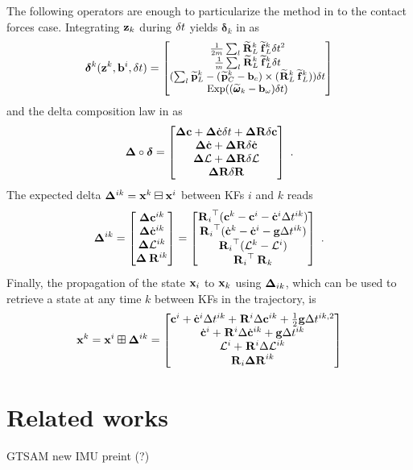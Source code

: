 The following operators are enough to particularize the  method in  to the contact forces case.
Integrating ${\bf z}_k$ during $\delta t$ yields $\bm\delta_k$ in  as
%
\begin{equation}
\small
    \bm\delta^{k}({\bf z}^k, {\bf b}^i, \delta t) =
    \begin{bmatrix}
    \frac{1}{2m} \sum_l \prescript{}{}{\widetilde{{\bf R}}}_{L}^k \prescript{}{}{\widetilde{{\bf f}}}_{L}^k \delta t^2
    \\
    \frac{1}{m} \sum_l \prescript{}{}{\widetilde{{\bf R}}}_{L}^k \prescript{}{}{\widetilde{{\bf f}}}_{L}^k \delta t 
    \\
    (\sum_l \prescript{}{}{\widetilde{{\bf p}}}_{L}^k - (\prescript{}{}{\widetilde{{\bf p}}}_{C}^k - {\bf b}_c) \times (\prescript{}{}{\widetilde{{\bf R}}}_{L}^k \prescript{}{}{\widetilde{{\bf f}}}_{L}^k ))\delta t
    \\
    \operatorname*{Exp}((\prescript{}{}{\widetilde{\pmb{\omega}}}_{k} - {\bf b}_{\omega})\delta t)
    \end{bmatrix}
\normalsize
\end{equation}
%
and the delta composition law in  as
%
\begin{equation}
    {{\bm \Delta}} \circ \bm\delta = 
    \begin{bmatrix}
    {{\bm \Delta}}{\bf c} + {{\bm \Delta}}\dot{{\bf c}} \delta t + {\bm \Delta {\bf R}}  \delta{\bf c}
    \\
    {{\bm \Delta}}\dot{{\bf c}} + {\bm \Delta {\bf R}}  \delta \dot{{\bf c}}
    \\
    {{\bm \Delta}}\mathcal{L} + {\bm \Delta {\bf R}}  \delta \mathcal{L}
    \\
    {\bm \Delta {\bf R}}{\delta{\bf R}}
    \end{bmatrix}
    ~.
    \label{eq:DeltaDTCompo}
\end{equation}
%
The expected delta ${{\bm \Delta}}^{ik}={\bf x}^k\boxminus{\bf x}^i$ between KFs $i$ and $k$ reads
%
\begin{equation}
{{\bm \Delta}}^{ik} =
\begin{bmatrix}
   {{\bm \Delta}}{\bf c}^{ik} \\ {{\bm \Delta}}\dot{{\bf c}}^{ik} \\ {{\bm \Delta}}\mathcal{L}^{ik} \\ {{\bm \Delta}}\prescript{}{}{{\bf R}}_{}^{ik}
\end{bmatrix}
=
\begin{bmatrix}
	{\prescript{}{}{{\bf R}}_{i}}^{\top} ({\bf c}^k - {\bf c}^i - \dot{{\bf c}}^i \Delta t^{ik})
	\\
	{\prescript{}{}{{\bf R}}_{i}}^{\top} (\dot{{\bf c}}^{k} - \dot{{\bf c}}^{i} - {\bf g} \Delta t^{ik})
	\\
	{\prescript{}{}{{\bf R}}_{i}}^{\top} (\mathcal{L}^{k} - \mathcal{L}^{i})
	\\
{\prescript{}{}{{\bf R}}_{i}}^{\top} \prescript{}{}{{\bf R}}_{k}
\end{bmatrix}
~.
\end{equation}
%
Finally, the propagation of the state ${\bf x}_i$ to ${\bf x}_k$ using ${{\bm \Delta}}_{ik}$, which can be used to retrieve a state at any time $k$ between KFs in the trajectory, is
%
\begin{equation}
	{\bf x}^k = {\bf x}^i \boxplus {{\bm \Delta}}^{ik} =
	\begin{bmatrix}
	{\bf c}^i + \dot{{\bf c}}^i \Delta t^{ik} + \prescript{}{}{{\bf R}}_{}^i \Delta {\bf c}^{ik} + \frac{1}{2} {\bf g} \Delta t^{ik,2}
	\\
	\dot{{\bf c}}^i + \prescript{}{}{{\bf R}}_{}^i \Delta \dot{{\bf c}}^{ik} + {\bf g} \Delta t^{ik}
	\\
	\mathcal{L}^i + \prescript{}{}{{\bf R}}_{}^i \Delta \mathcal{L}^{ik}
	\\
	\prescript{}{}{{\bf R}}_{i} {\bm \Delta {\bf R}}^{ik}
	\end{bmatrix}
\end{equation}
%
%
%
%


\section{Related works}

\cite{hartley2018legged}
\cite{wisth2020preintegrated}
\cite{lupton-09}
\cite{forster2017-TRO}
GTSAM new IMU preint (?)
\cite{eckenhoff2019closed}
\cite{brossard2021associating}
\cite{luo2021unified} 